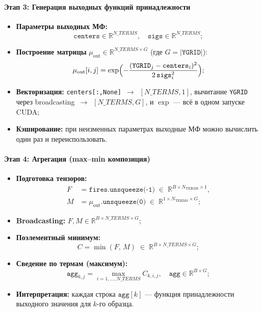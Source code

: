 \paragraph{Этап 3: Генерация выходных функций принадлежности}  
\begin{itemize}
  \item {\bf Параметры выходных МФ:}  
    $$
      \texttt{centers}\in\mathbb{R}^{N\_{TERMS}},\quad
      \texttt{sigs}\in\mathbb{R}^{N\_{TERMS}};
    $$
  \item {\bf Построение матрицы} $\mu_{\text{out}}\in\mathbb{R}^{N\_{TERMS}\times G}$  
    (где $G = |\texttt{YGRID}|$):  
    $$
      \mu_{\text{out}}[i,j]
      = \exp\Bigl(
          -\frac{(\texttt{YGRID}_j - \texttt{centers}_i)^2}
                {2\,\texttt{sigs}_i^2}
        \Bigr);
    $$
  \item {\bf Векторизация:}  
    \texttt{centers[:,None]}~$\to$~$[N\_{TERMS},1]$,  
    вычитание \texttt{YGRID} через broadcasting~$\to$~$[N\_{TERMS},G]$,  
    и $\exp$ — всё в одном запуске CUDA;
  \item {\bf Кэширование:}  
    при неизменных параметрах выходные МФ можно вычислить один раз и переиспользовать.
\end{itemize}

\paragraph{Этап 4: Агрегация (max–min композиция)}  
\begin{itemize}
  \item {\bf Подготовка тензоров:}  
  \[
    \begin{split}
      F &= \texttt{fires.unsqueeze(-1)}
            \;\in\;\mathbb{R}^{B\times N_{\text{TERMS}}\times 1},\\
      M &= \mu_{\text{out}}.\texttt{unsqueeze(0)}
            \;\in\;\mathbb{R}^{1\times N_{\text{TERMS}}\times G};
    \end{split}
  \]
  \item {\bf Broadcasting:}  
    $F,M\in\mathbb{R}^{B\times N\_{TERMS}\times G}$;
  \item {\bf Поэлементный минимум:}  
    $$
      C = \min(F,\,M)
      \;\in\;\mathbb{R}^{B\times N\_{TERMS}\times G};
    $$
  \item {\bf Сведение по термам (максимум):}  
    $$
      \texttt{agg}_{k,j}
      = \max_{i=1,\dots,N\_{TERMS}} C_{k,i,j},
      \quad \texttt{agg}\in\mathbb{R}^{B\times G};
    $$
  \item {\bf Интерпретация:}  
    каждая строка $\texttt{agg}[k]$ — функция принадлежности выходного значения для $k$-го образца.
\end{itemize}

